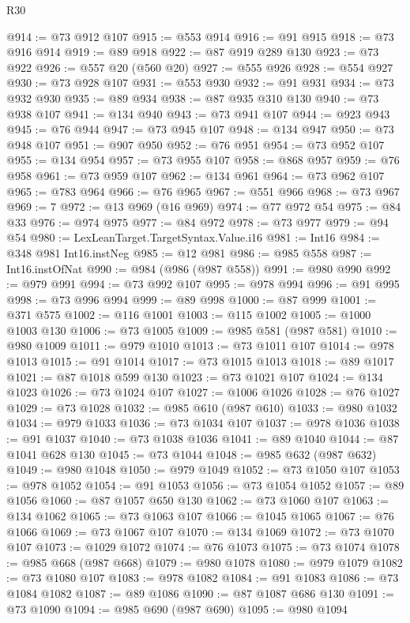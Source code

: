 \begin{lexlean}{R30}
\begin{coremodule}
@914 := @73 @912 @107
@915 := @553 @914
@916 := @91 @915
@918 := @73 @916 @914
@919 := @89 @918
@922 := @87 @919 @289 @130
@923 := @73 @922
@926 := @557 @20 (@560 @20)
@927 := @555 @926
@928 := @554 @927
@930 := @73 @928 @107
@931 := @553 @930
@932 := @91 @931
@934 := @73 @932 @930
@935 := @89 @934
@938 := @87 @935 @310 @130
@940 := @73 @938 @107
@941 := @134 @940
@943 := @73 @941 @107
@944 := @923 @943
@945 := @76 @944
@947 := @73 @945 @107
@948 := @134 @947
@950 := @73 @948 @107
@951 := @907 @950
@952 := @76 @951
@954 := @73 @952 @107
@955 := @134 @954
@957 := @73 @955 @107
@958 := @868 @957
@959 := @76 @958
@961 := @73 @959 @107
@962 := @134 @961
@964 := @73 @962 @107
@965 := @783 @964
@966 := @76 @965
@967 := @551 @966
@968 := @73 @967
@969 := 7
@972 := @13 @969 (@16 @969)
@974 := @77 @972 @54
@975 := @84 @33
@976 := @974 @975
@977 := @84 @972
@978 := @73 @977
@979 := @94 @54
@980 := LexLeanTarget.TargetSyntax.Value.i16
@981 := Int16
@984 := @348 @981 Int16.instNeg
@985 := @12 @981
@986 := @985 @558
@987 := Int16.instOfNat
@990 := @984 (@986 (@987 @558))
@991 := @980 @990
@992 := @979 @991
@994 := @73 @992 @107
@995 := @978 @994
@996 := @91 @995
@998 := @73 @996 @994
@999 := @89 @998
@1000 := @87 @999
@1001 := @371 @575
@1002 := @116 @1001
@1003 := @115 @1002
@1005 := @1000 @1003 @130
@1006 := @73 @1005
@1009 := @985 @581 (@987 @581)
@1010 := @980 @1009
@1011 := @979 @1010
@1013 := @73 @1011 @107
@1014 := @978 @1013
@1015 := @91 @1014
@1017 := @73 @1015 @1013
@1018 := @89 @1017
@1021 := @87 @1018 @599 @130
@1023 := @73 @1021 @107
@1024 := @134 @1023
@1026 := @73 @1024 @107
@1027 := @1006 @1026
@1028 := @76 @1027
@1029 := @73 @1028
@1032 := @985 @610 (@987 @610)
@1033 := @980 @1032
@1034 := @979 @1033
@1036 := @73 @1034 @107
@1037 := @978 @1036
@1038 := @91 @1037
@1040 := @73 @1038 @1036
@1041 := @89 @1040
@1044 := @87 @1041 @628 @130
@1045 := @73 @1044
@1048 := @985 @632 (@987 @632)
@1049 := @980 @1048
@1050 := @979 @1049
@1052 := @73 @1050 @107
@1053 := @978 @1052
@1054 := @91 @1053
@1056 := @73 @1054 @1052
@1057 := @89 @1056
@1060 := @87 @1057 @650 @130
@1062 := @73 @1060 @107
@1063 := @134 @1062
@1065 := @73 @1063 @107
@1066 := @1045 @1065
@1067 := @76 @1066
@1069 := @73 @1067 @107
@1070 := @134 @1069
@1072 := @73 @1070 @107
@1073 := @1029 @1072
@1074 := @76 @1073
@1075 := @73 @1074
@1078 := @985 @668 (@987 @668)
@1079 := @980 @1078
@1080 := @979 @1079
@1082 := @73 @1080 @107
@1083 := @978 @1082
@1084 := @91 @1083
@1086 := @73 @1084 @1082
@1087 := @89 @1086
@1090 := @87 @1087 @686 @130
@1091 := @73 @1090
@1094 := @985 @690 (@987 @690)
@1095 := @980 @1094

\end{coremodule}
\end{lexlean}
